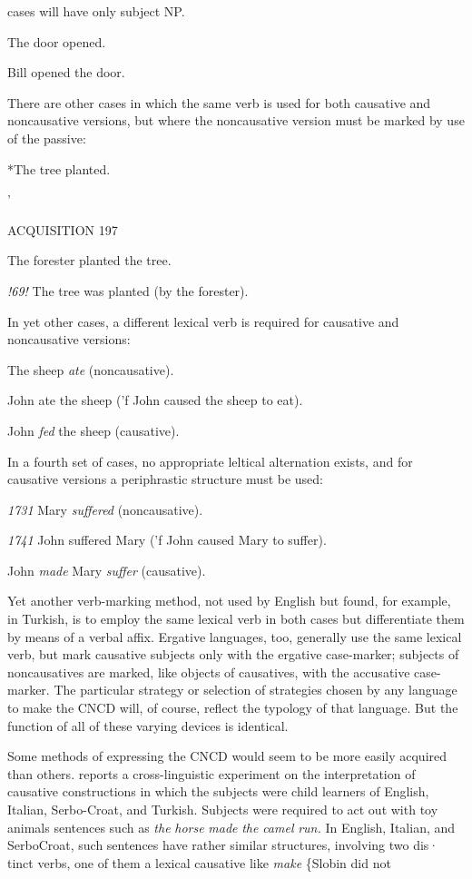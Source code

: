 cases will have only subject NP.

\ea\label{ex:65}
 The door opened.
\glt
\z

\ea\label{ex:66}
 Bill opened the door.
\glt
\z

There are other cases in which the same verb is used for both causative and noncausative versions, but where the noncausative version must be marked by use of the passive:

\ea\label{ex:67}
 *The tree planted.
\glt
\z

'

ACQUISITION 197

\ea\label{ex:68}
 The forester planted the tree.
\glt
\z

\textit{!69! }The tree was planted (by the forester).

In yet other cases, a different lexical verb is required for causa\-tive and noncausative versions:

\ea\label{ex:70}
 The sheep \textit{ate} (noncausative).
\glt
\z

\ea\label{ex:71}
 John ate the sheep ('f John caused the sheep to eat).
\glt
\z

\ea\label{ex:72}
 John \textit{fed }the sheep (causative).
\glt
\z

In a fourth set of cases, no appropriate leltical alternation exists, and for causative versions a periphrastic structure must be used:

\textit{1731 }Mary \textit{suffered} (noncausative).

\textit{1741 }John suffered Mary ('f John caused Mary to suffer).

\ea\label{ex:75}
 John \textit{made} Mary \textit{suffer} (causative).
\glt
\z

Yet another verb-marking method, not used by English but found, for example, in Turkish, is to employ the same lexical verb in both cases but differentiate them by means of a verbal affix. Ergative languages, too, generally use the same lexical verb, but mark causative subjects only with the ergative case-marker; subjects of noncausatives are marked, like objects of causatives, with the accusative case-marker. The particular strategy or selection of strategies chosen by any lan\-guage to make the CNCD will, of course, reflect the typology of that language. But the function of all of these varying devices is identical.

Some methods of expressing the CNCD would seem to be more easily acquired than others. \citet{Slobin1978} reports a cross-linguistic experiment on the interpretation of causative constructions in which the subjects were child learners of English, Italian, Serbo-Croat, and Turkish. Subjects were required to act out with toy animals sentences such as \textit{the} \textit{horse} \textit{made} \textit{the} \textit{camel} \textit{run.} In English, Italian, and Serbo\-Croat, such sentences have rather similar structures, involving two dis· tinct verbs, one of them a lexical causative like \textit{make} \{Slobin did not

